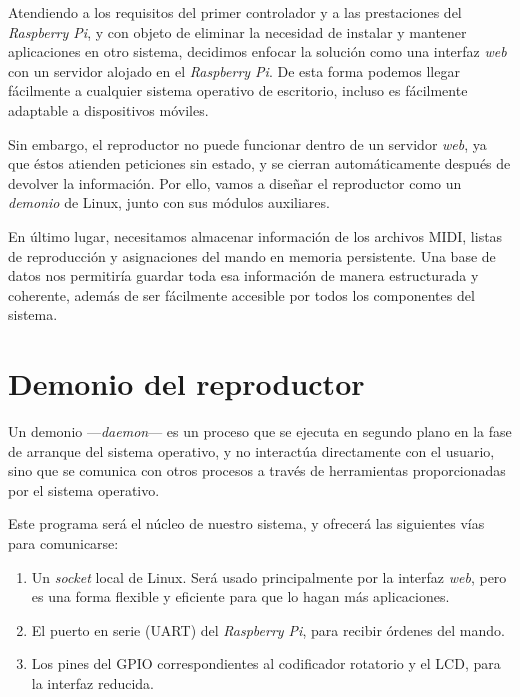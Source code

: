 Atendiendo a los requisitos del primer controlador y a las prestaciones del \textit{Raspberry Pi}, y con objeto de eliminar la necesidad de instalar y mantener aplicaciones en otro sistema, decidimos enfocar la solución como una interfaz \textit{web} con un servidor alojado en el \textit{Raspberry Pi}. De esta forma podemos llegar fácilmente a cualquier sistema operativo de escritorio, incluso es fácilmente adaptable a dispositivos móviles.

Sin embargo, el reproductor no puede funcionar dentro de un servidor \textit{web}, ya que éstos atienden peticiones sin estado, y se cierran automáticamente después de devolver la información. Por ello, vamos a diseñar el reproductor como un \textit{demonio} de Linux, junto con sus módulos auxiliares.

En último lugar, necesitamos almacenar información de los archivos \acrshort{MIDI}, listas de reproducción y asignaciones del mando en memoria persistente. Una base de datos nos permitiría guardar toda esa información de manera estructurada y coherente, además de ser fácilmente accesible por todos los componentes del sistema.

\section{Demonio del reproductor}

Un demonio ---\textit{daemon}--- es un proceso que se ejecuta en segundo plano en la fase de arranque del sistema operativo, y no interactúa directamente con el usuario, sino que se comunica con otros procesos a través de herramientas proporcionadas por el sistema operativo. \cite{wiki_demonio}

Este programa será el núcleo de nuestro sistema, y ofrecerá las siguientes vías para comunicarse:

\begin{enumerate}
	\item Un \textit{socket} local de Linux. Será usado principalmente por la interfaz \textit{web}, pero es una forma flexible y eficiente para que lo hagan más aplicaciones.
	
	\item El puerto en serie (\acrshort{UART}) del \textit{Raspberry Pi}, para recibir órdenes del mando.
	
	\item Los pines del \acrshort{GPIO} correspondientes al codificador rotatorio y el \acrshort{LCD}, para la interfaz reducida.
\end{enumerate}

